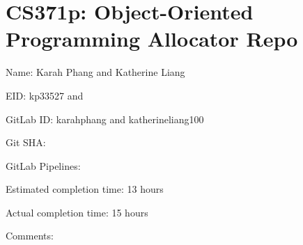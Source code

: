\chapter{CS371p\+: Object-\/\+Oriented Programming Allocator Repo}
\hypertarget{md_README}{}\label{md_README}
\label{md_README_autotoc_md0}%
%

\begin{DoxyItemize}
\item Name\+: Karah Phang and Katherine Liang
\item EID\+: kp33527 and
\item Git\+Lab ID\+: karahphang and katherineliang100
\item Git SHA\+:
\item Git\+Lab Pipelines\+:
\item Estimated completion time\+: 13 hours
\item Actual completion time\+: 15 hours
\item Comments\+: 
\end{DoxyItemize}
